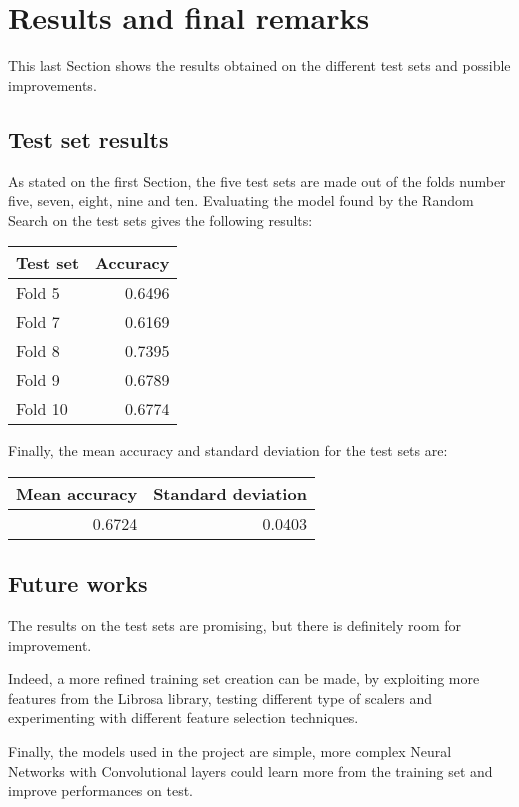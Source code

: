 \section{Results and final remarks}
\label{results}

This last Section shows the results obtained on the different 
test sets and possible improvements.

\subsection{Test set results}
As stated on the first Section, the five test sets are made out of the 
folds number five, seven, eight, nine and ten.
Evaluating the model found by the Random Search on the test sets 
gives the following results: 

\begin{center}
    \begin{tabular}{ |l|r| } 
        \hline
        Test set & Accuracy\\
        \hline
        Fold 5 & 0.6496 \\
        Fold 7 & 0.6169 \\
        Fold 8 & 0.7395 \\
        Fold 9 & 0.6789 \\
        Fold 10 & 0.6774 \\ 
        \hline
    \end{tabular}
\end{center}

Finally, the mean accuracy and standard deviation for the test sets are: 
\begin{center}
    \begin{tabular}{ |r|r| } 
        \hline
        Mean accuracy & Standard deviation\\
        \hline
        0.6724 & 0.0403 \\
        \hline
    \end{tabular}
\end{center}

\subsection{Future works}

The results on the test sets are promising, but there is definitely 
room for improvement.

Indeed, a more refined training set creation can be made, by exploiting 
more features from the Librosa library, testing different type 
of scalers and experimenting with different feature selection 
techniques.

Finally, the models used in the project are simple, more complex 
Neural Networks with Convolutional layers could learn more from the 
training set and improve performances on test.